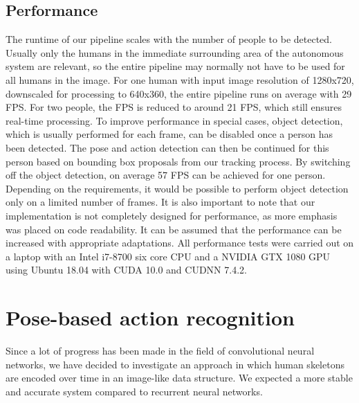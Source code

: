 \documentclass[a4paper, 10pt, conference]{ieeeconf}
\begin{document}
\subsection{Performance}
\label{sec:performance}
The runtime of our pipeline scales with the number of people to be detected. Usually only the humans in the immediate surrounding area of the autonomous system are relevant, so the entire pipeline may normally not have to be used for all humans in the image. For one human with input image resolution of 1280x720, downscaled for processing to 640x360, the entire pipeline runs on average with 29 FPS. For two people, the FPS is reduced to around 21 FPS, which still ensures real-time processing. To improve performance in special cases, object detection, which is usually performed for each frame, can be disabled once a person has been detected. The pose and action detection can then be continued for this person based on bounding box proposals from our tracking process. By switching off the object detection, on average 57 FPS can be achieved for one person. Depending on the requirements, it would be possible to perform object detection only on a limited number of frames. It is also important to note that our implementation is not completely designed for performance, as more emphasis was placed on code readability. It can be assumed that the performance can be increased with appropriate adaptations. All performance tests were carried out on a laptop with an Intel i7-8700 six core CPU and a NVIDIA GTX 1080 GPU using Ubuntu 18.04 with CUDA 10.0 and CUDNN 7.4.2.

\section{Pose-based action recognition}
\label{sec:pipeline_action_rec}
  
Since a lot of progress has been made in the field of convolutional neural networks, we have decided to investigate an approach in which human skeletons are encoded over time in an image-like data structure. We expected a more stable and accurate system compared to recurrent neural networks. 
\end{document}

